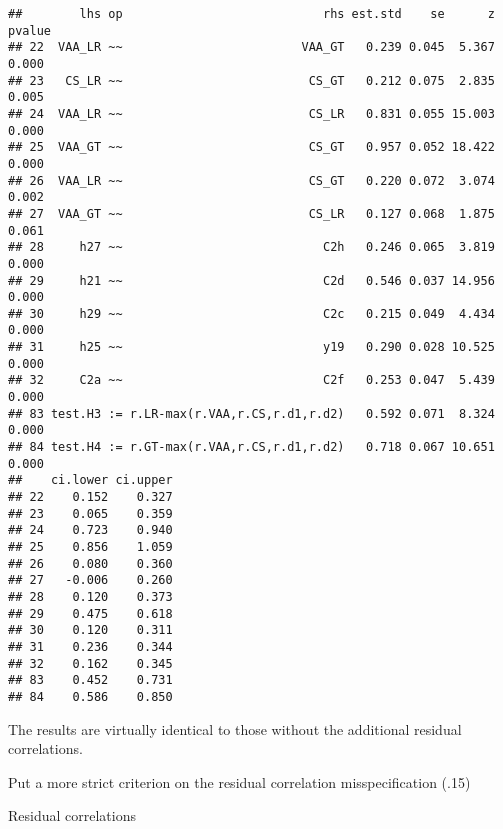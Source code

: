 \documentclass[
]{article}
\newenvironment{Shaded}{\begin{snugshade}}{\end{snugshade}}
\newcommand{\CommentTok}[1]{\textcolor[rgb]{0.56,0.35,0.01}{\textit{#1}}}
\newcommand{\DataTypeTok}[1]{\textcolor[rgb]{0.13,0.29,0.53}{#1}}
\newcommand{\DecValTok}[1]{\textcolor[rgb]{0.00,0.00,0.81}{#1}}
\newcommand{\KeywordTok}[1]{\textcolor[rgb]{0.13,0.29,0.53}{\textbf{#1}}}
\newcommand{\NormalTok}[1]{#1}
\newcommand{\OperatorTok}[1]{\textcolor[rgb]{0.81,0.36,0.00}{\textbf{#1}}}
\newcommand{\StringTok}[1]{\textcolor[rgb]{0.31,0.60,0.02}{#1}}
\begin{document}
\begin{verbatim}
##        lhs op                            rhs est.std    se      z pvalue
## 22  VAA_LR ~~                         VAA_GT   0.239 0.045  5.367  0.000
## 23   CS_LR ~~                          CS_GT   0.212 0.075  2.835  0.005
## 24  VAA_LR ~~                          CS_LR   0.831 0.055 15.003  0.000
## 25  VAA_GT ~~                          CS_GT   0.957 0.052 18.422  0.000
## 26  VAA_LR ~~                          CS_GT   0.220 0.072  3.074  0.002
## 27  VAA_GT ~~                          CS_LR   0.127 0.068  1.875  0.061
## 28     h27 ~~                            C2h   0.246 0.065  3.819  0.000
## 29     h21 ~~                            C2d   0.546 0.037 14.956  0.000
## 30     h29 ~~                            C2c   0.215 0.049  4.434  0.000
## 31     h25 ~~                            y19   0.290 0.028 10.525  0.000
## 32     C2a ~~                            C2f   0.253 0.047  5.439  0.000
## 83 test.H3 := r.LR-max(r.VAA,r.CS,r.d1,r.d2)   0.592 0.071  8.324  0.000
## 84 test.H4 := r.GT-max(r.VAA,r.CS,r.d1,r.d2)   0.718 0.067 10.651  0.000
##    ci.lower ci.upper
## 22    0.152    0.327
## 23    0.065    0.359
## 24    0.723    0.940
## 25    0.856    1.059
## 26    0.080    0.360
## 27   -0.006    0.260
## 28    0.120    0.373
## 29    0.475    0.618
## 30    0.120    0.311
## 31    0.236    0.344
## 32    0.162    0.345
## 83    0.452    0.731
## 84    0.586    0.850
\end{verbatim}

The results are virtually identical to those without the additional
residual correlations.

Put a more strict criterion on the residual correlation misspecification
(.15)

Residual correlations

\begin{Shaded}
\end{Shaded}
\end{document}

